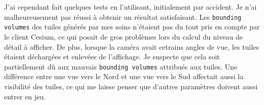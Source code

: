 J'ai cependant fait quelques tests en l'utilisant, initialement par accident. Je n'ai malheureusement pas réussi à obtenir un résultat satisfaisant. Les \texttt{bounding volumes} des tuiles générés par mes soins n'étaient pas du tout pris en compte par le client Cesium, ce qui posait de gros problèmes lors du calcul du niveau de détail à afficher. De plus, lorsque la caméra avait cetrains angles de vue, les tuiles étaient déchargées et enlevées de l'affichage. Je suspecte que cela soit partiellement dû aux mauvais \texttt{bounding volumes} attribués aux tuiles. Une différence entre une vue vers le Nord et une vue vers le Sud affectait aussi la visibilité des tuiles, ce qui me laisse penser que d'autres paramètres doivent aussi entrer en jeu.